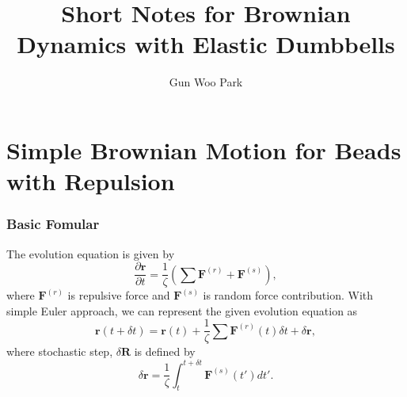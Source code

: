 \documentclass[10pt, a4paper]{article}
\title{Short Notes for Brownian Dynamics with Elastic Dumbbells}
\author{Gun Woo Park}
\begin{document}
\maketitle 



\part{Simple Brownian Motion for Beads with Repulsion}
\section{Basic Fomular}
The evolution equation is given by
\begin{equation}
\frac{\partial \mathbf{r}}{\partial t} = \frac{1}{\zeta}\left(\sum \mathbf{F}^{(r)} + \mathbf{F}^{(s)}\right),
\end{equation}
where $\mathbf{F}^{(r)}$ is repulsive force and $\mathbf{F}^{(s)}$ is random force contribution. With simple Euler approach, we can represent the given evolution equation as
\begin{equation}
\mathbf{r}(t + \delta t) = \mathbf{r}(t) + \frac{1}{\zeta}\sum\mathbf{F}^{(r)}(t)\delta t + \delta \mathbf{r},\label{eq:update_position}
\end{equation}
where stochastic step, $\delta \mathbf{R}$ is defined by
\begin{equation}
\delta \mathbf{r} = \frac{1}{\zeta}\int_t^{t+\delta t}\mathbf{F}^{(s)}(t')dt'.\label{eq:stochastic_step}
\end{equation}
\end{document}
